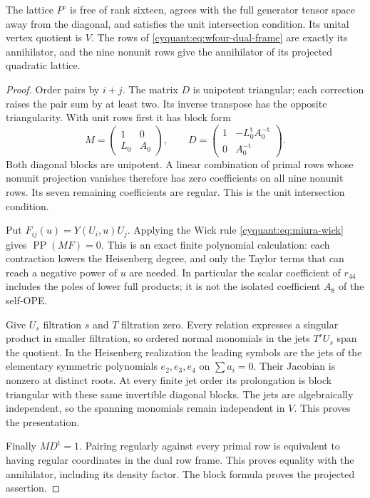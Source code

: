 \begin{proposition}\label{cyquant:prop:wfour-primal}
The lattice $P^\circ$ is free of rank sixteen, agrees with the full
generator tensor space away from the diagonal, and satisfies the unit
intersection condition.  Its unital vertex quotient is $V$.  The rows
of \eqref{cyquant:eq:wfour-dual-frame} are exactly its annihilator,
and the nine nonunit rows give the annihilator of its projected
quadratic lattice.
\end{proposition}

\begin{proof}
Order pairs by $i+j$.  The matrix $D$ is unipotent triangular; each
correction raises the pair sum by at least two.  Its inverse transpose
has the opposite triangularity.  With unit rows first it has block form
\[
 M=\begin{pmatrix}1&0\\ L_0&A_0\end{pmatrix},\qquad
 D=\begin{pmatrix}1&-L_0^{\mathrm t}A_0^{-\mathrm t}\\0&A_0^{-\mathrm t}\end{pmatrix}.
\]
Both diagonal blocks are unipotent.  A linear combination of primal
rows whose nonunit projection vanishes therefore has zero coefficients
on all nine nonunit rows.  Its seven remaining coefficients are regular.
This is the unit intersection condition.

Put $F_{ij}(u)=Y(U_i,u)U_j$.  Applying the Wick rule
\eqref{cyquant:eq:miura-wick} gives $\operatorname{PP}(MF)=0$.
This is an exact finite polynomial calculation: each contraction lowers
the Heisenberg degree, and only the Taylor terms that can reach a
negative power of $u$ are needed.  In particular the scalar coefficient
of $r_{44}$ includes the poles of lower full products; it is not the
isolated coefficient $A_8$ of the self-OPE.

Give $U_s$ filtration $s$ and $T$ filtration zero.  Every relation
expresses a singular product in smaller filtration, so ordered normal
monomials in the jets $T^rU_s$ span the quotient.  In the Heisenberg
realization the leading symbols are the jets of the elementary
symmetric polynomials $e_2,e_3,e_4$ on $\sum a_i=0$.  Their Jacobian
is nonzero at distinct roots.  At every finite jet order its prolongation
is block triangular with these same invertible diagonal blocks.
The jets are algebraically independent, so the spanning monomials
remain independent in $V$.  This proves the presentation.

Finally $MD^{\mathrm t}=1$.  Pairing regularly against every primal
row is equivalent to having regular coordinates in the dual row
frame.  This proves equality with the annihilator, including its
density factor.  The block formula proves the projected assertion.
\end{proof}

